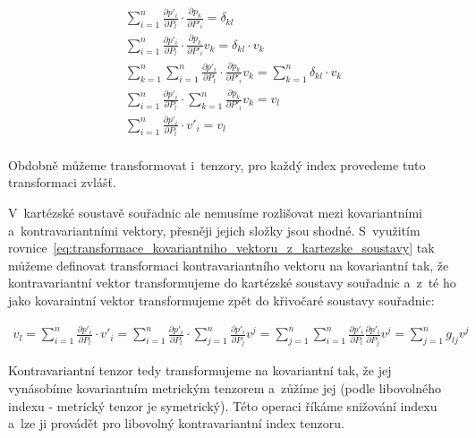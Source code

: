 \begin{equation}
\label{eq:transformace_kovariantniho_vektoru_z_kartezske_soustavy}
\begin{split}
\sum_{i=1}^n \frac{\partial p'_i}{\partial P_l} \cdot \frac{\partial p_k}{\partial P'_i} = \delta_{kl} \\
\sum_{i=1}^n \frac{\partial p'_i}{\partial P_l} \cdot \frac{\partial p_k}{\partial P'_i} v_k = \delta_{kl} \cdot v_k \\
\sum_{k=1}^n \sum_{i=1}^n \frac{\partial p'_i}{\partial P_l} \cdot \frac{\partial p_k}{\partial P'_i} v_k = \sum_{k=1}^n \delta_{kl} \cdot v_k \\
\sum_{i=1}^n \frac{\partial p'_i}{\partial P_l} \cdot \sum_{k=1}^n \frac{\partial p_k}{\partial P'_i} v_k = v_l \\
\sum_{i=1}^n \frac{\partial p'_i}{\partial P_l} \cdot v'_i = v_l \\
\end{split}
\end{equation}

Obdobně můžeme transformovat i~tenzory, pro každý index provedeme tuto transformaci zvlášť.

V~kartézské soustavě souřadnic ale nemusíme rozlišovat mezi kovariantními a~kontravariantními vektory, přesněji jejich složky jsou shodné. S~využitím rovnice~\eqref{eq:transformace_kovariantniho_vektoru_z_kartezske_soustavy} tak můžeme definovat transformaci kontravariantního vektoru na kovariantní tak, že kontravariantní vektor transformujeme do kartézské soustavy souřadnic a~z~té ho jako kovaraintní vektor transformujeme zpět do křivočaré soustavy souřadnic:

\begin{equation}
\begin{split}
v_l = \sum_{i=1}^n \frac{\partial p'_i}{\partial P_l} \cdot v'_i = \sum_{i=1}^n \frac{\partial p'_i}{\partial P_l} \cdot \sum_{j=1}^n \frac{\partial p'_i}{\partial P_j} v^j = \sum_{j=1}^n \sum_{i=1}^n \frac{\partial p'_i}{\partial P_l} \frac{\partial p'_i}{\partial P_j} v^j = \sum_{j=1}^n g_{lj} v^j
\end{split}
\end{equation}

Kontravariantní tenzor tedy transformujeme na kovariantní tak, že jej vynásobíme kovariantním metrickým tenzorem a~zůžíme jej (podle libovolného indexu - metrický tenzor je symetrický). Této operaci říkáme snižování indexu a~lze ji provádět pro libovolný kontravariantní index tenzoru.

